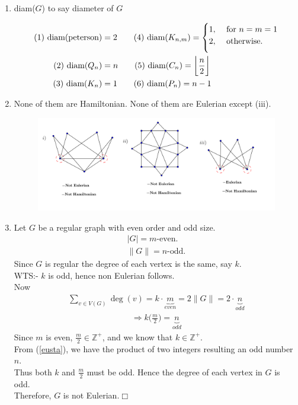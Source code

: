\documentclass[paper=a4, fontsize=11pt,twoside]{scrartcl}		%
\theoremstyle{definition}
\theoremstyle{remark}
\begin{document}
\begin{enumerate}
  (b) The longest path in $G$ is of length $11$.

  \item diam($G$) to say diameter of $G$

  \begin{align*}
  \text{(1) diam(peterson)}&=2\qquad \text{(4) diam($K_{n,m}$)}=\begin{cases}
1,&\mbox{ for }n=m=1\\
\medskip
2,&\mbox{ otherwise.}
\end{cases}\\
  \text{(2) diam($Q_n$)}&=n \qquad \text{(5) diam($C_n$)}=\biggl\lfloor\frac{n}{2}\biggl\rfloor\\
  \text{(3) diam($K_n$)}&=1 \qquad \text{(6) diam($P_n$)}=n-1
  \end{align*}
  \newpage
  \item None of them are Hamiltonian. None of them are Eulerian except (iii).

  \begin{figure}[hbt!]
\centering
\includegraphics[width=1.0\textwidth]{SolGrapAss3.png}
\end{figure}

  \item Let $G$ be a regular graph with even order and odd size.
  \begin{align*}
  |G|=m\text{-even}.\\
  \|G\|=n\text{-odd}.
  \end{align*}
  Since $G$ is regular the degree of each vertex is the same, say $k$. \\
  WTS:- $k$ is odd, hence non Eulerian follows.\\
  Now
  \begin{align*}
  \sum_{v\in V(G)}\deg(v)=k\cdot\underbrace{m}_{even}=2\|G\|=2\cdot\underbrace{n}_{odd}
  \end{align*}
  \begin{align}\label{eusta}
  \Rightarrow k\biggl(\frac{m}{2}\biggl)=\underbrace{n}_{odd}
  \end{align}
  Since $m$ is even, $\frac{m}{2}\in \mathbb{Z}^{+}$, and we know that $k\in \mathbb{Z}^{+}$.\\
  From (\ref{eusta}), we have the product of two integers resulting an odd number $n$.\\
  Thus both $k$ and $\frac{m}{2}$ must be odd. Hence the degree of each vertex in $G$ is odd.\\
  Therefore, $G$ is not Eulerian.$\Box$


\end{enumerate}
\end{document}
